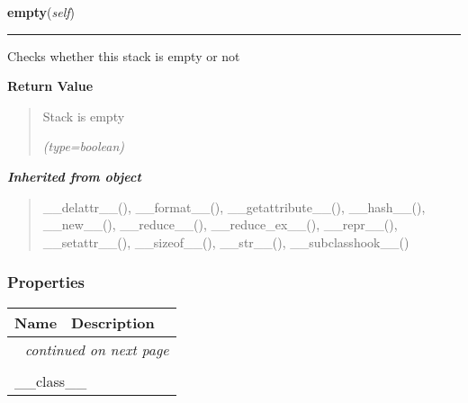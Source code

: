     \label{UnBlockMeSolver:Utility:Stack:Stack:empty}

    \vspace{0.5ex}

\hspace{.8\funcindent}\begin{boxedminipage}{\funcwidth}

    \raggedright \textbf{empty}(\textit{self})

    \vspace{-1.5ex}

    \rule{\textwidth}{0.5\fboxrule}
\setlength{\parskip}{2ex}
    Checks whether this stack is empty or not

\setlength{\parskip}{1ex}
      \textbf{Return Value}
    \vspace{-1ex}

      \begin{quote}
      Stack is empty

      {\it (type=boolean)}

      \end{quote}

    \end{boxedminipage}


\large{\textbf{\textit{Inherited from object}}}

\begin{quote}
\_\_delattr\_\_(), \_\_format\_\_(), \_\_getattribute\_\_(), \_\_hash\_\_(), \_\_new\_\_(), \_\_reduce\_\_(), \_\_reduce\_ex\_\_(), \_\_repr\_\_(), \_\_setattr\_\_(), \_\_sizeof\_\_(), \_\_str\_\_(), \_\_subclasshook\_\_()
\end{quote}


  \subsubsection{Properties}

    \vspace{-1cm}
\hspace{\varindent}\begin{longtable}{|p{\varnamewidth}|p{\vardescrwidth}|l}
\cline{1-2}
\cline{1-2} \centering \textbf{Name} & \centering \textbf{Description}& \\
\cline{1-2}
\endhead\cline{1-2}\multicolumn{3}{r}{\small\textit{continued on next page}}\\\endfoot\cline{1-2}
\endlastfoot\multicolumn{2}{|l|}{\textit{Inherited from object}}\\
\multicolumn{2}{|p{\varwidth}|}{\raggedright \_\_class\_\_}\\
\cline{1-2}
\end{longtable}

